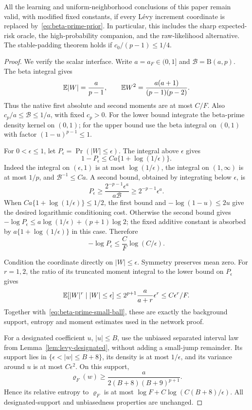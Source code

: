 \begin{proposition}
\label{prop:beta-prime}
All the learning and uniform-neighborhood conclusions of this paper remain valid, with modified fixed constants, if every L\'evy increment coordinate is replaced by~\eqref{eq:beta-prime-prior}. In particular, this includes the sharp expected-risk oracle, the high-probability companion, and the raw-likelihood alternative. The stable-padding theorem holds if $c_0/(p-1)\le1/4$.
\end{proposition}
\begin{proof}
We verify the scalar interface. Write $a=a_F\in(0,1]$ and
$\mathcal B=\mathrm B(a,p)$. The beta integral gives
\[
 \mathbb E|W|=\frac{a}{p-1},\qquad
 \mathbb E W^2=\frac{a(a+1)}{(p-1)(p-2)}.
\]
Thus the native first absolute and second moments are at most $C/F$.
Also $c_p/a\le\mathcal B\le1/a$, with fixed $c_p>0$. For the lower bound integrate the beta-prime density kernel on $(0,1)$; for the upper bound use the beta integral on $(0,1)$ with factor $(1-u)^{p-1}\le1$.

For $0<\epsilon\le1$, let $P_\epsilon=\Pr(|W|\le\epsilon)$.
The integral above $\epsilon$ gives
\[
 1-P_\epsilon\le Ca\{1+\log(1/\epsilon)\}.
\]
Indeed the integral on $(\epsilon,1)$ is at most
$\log(1/\epsilon)$, the integral on $(1,\infty)$ is at most $1/p$,
and $\mathcal B^{-1}\le Ca$.
A second bound, obtained by integrating below $\epsilon$, is
\[
 P_\epsilon\ge
 \frac{2^{-p-1}\epsilon^a}{a\mathcal B}
 \ge2^{-p-1}\epsilon^a.
\]
When $Ca\{1+\log(1/\epsilon)\}\le1/2$, the first bound and
$-\log(1-u)\le2u$ give the desired logarithmic conditioning cost.
Otherwise the second bound gives
$-\log P_\epsilon\le a\log(1/\epsilon)+(p+1)\log2$;
the fixed additive constant is absorbed by
$a\{1+\log(1/\epsilon)\}$ in this case. Therefore
\begin{equation}
 -\log P_\epsilon\le\frac C F\log(C/\epsilon).
 \label{eq:beta-prime-small-ball}
\end{equation}

Condition the coordinate directly on $|W|\le\epsilon$.
Symmetry preserves mean zero. For $r=1,2$, the ratio of its truncated moment integral to the lower bound on $P_\epsilon$ gives
\[
 \mathbb E[|W|^r\mid |W|\le\epsilon]
 \le 2^{p+1}\frac{a}{a+r}\epsilon^r
 \le C\epsilon^r/F.
\]
Together with~\eqref{eq:beta-prime-small-ball}, these are exactly the background support, entropy and moment estimates used in the network proof.

For a designated coefficient $u$, $|u|\le B$, use the unbiased separated interval law from Lemma~\ref{lem:levy-designated}, without adding a small-jump remainder. Its support lies in
$\{\epsilon<|w|\le B+8\}$, its density is at most $1/\epsilon$,
and its variance around $u$ is at most $C\epsilon^2$.
On this support,
\[
 \varrho_F(w)\ge
 \frac{a}{2(B+8)(B+9)^{p+1}}.
\]
Hence its relative entropy to $\varrho_F$ is at most
$\log F+C\log(C(B+8)/\epsilon)$.
All designated-support and unbiasedness properties are unchanged.


\end{proof}
